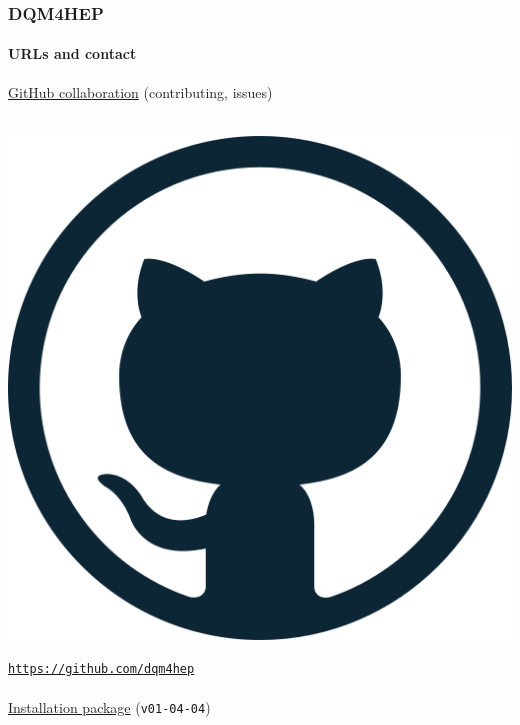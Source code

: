\documentclass[presentation, 10pt]{beamer}
\begin{document}
\begin{frame}
  \frametitle{DQM4HEP}
  \framesubtitle{URLs and contact}
  \footnotesize
  \underline{GitHub collaboration} (contributing, issues)\\
  \vspace*{0.1cm}
  ~~~
  \begin{minipage}{0.03\linewidth}
    \includegraphics[width=\linewidth]{figs/github-logo.png}
  \end{minipage}
  \href{https://github.com/dqm4hep}{\tt https://github.com/dqm4hep} \\
  ~\\
  \underline{Installation package} (\texttt{v01-04-04}) \\
  \vspace*{0.1cm}
  ~~~
  \begin{minipage}{0.03\linewidth}

\end{minipage}
\end{frame}
\end{document}
